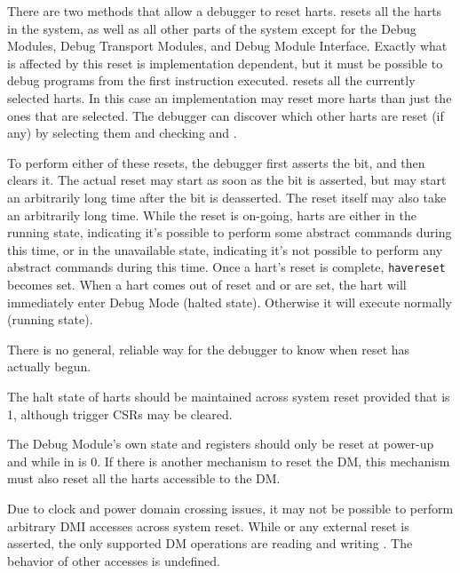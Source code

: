 There are two methods that allow a debugger to reset harts.
\FdmDmcontrolNdmreset resets all the harts in the system, as well as all other
parts of the system except for the Debug Modules, Debug Transport Modules,
and Debug Module Interface.
Exactly what is affected by this reset is implementation dependent, but it
must be possible to debug programs from the first instruction executed.
\FdmDmcontrolHartreset resets all the currently selected harts. In this case an
implementation may reset more harts than just the ones that are selected. The
debugger can discover which other harts are reset (if any) by selecting them
and checking \FdmDmstatusAnyhavereset and \FdmDmstatusAllhavereset.

To perform either of these resets, the debugger first asserts the bit, and then
clears it. The actual reset may start as soon as the bit is asserted, but may
start an arbitrarily long time after the bit is deasserted. The reset itself
may also take an arbitrarily long time.  While the reset is
on-going, harts are either in the running state, indicating it's possible to
perform some abstract commands during this time, or in the unavailable state,
indicating it's not possible to perform any abstract commands during this time.
Once a hart's reset is complete, {\tt havereset} becomes set.  When a hart comes out
of reset and \FdmDmcontrolHaltreq or \Fresethaltreq are set, the hart will
immediately enter Debug Mode (halted state). Otherwise it will execute normally
(running state).

\begin{commentary}
    There is no general, reliable way for the debugger to know when reset has
    actually begun.
\end{commentary}

The halt state of harts should be
maintained across system reset provided that \FdmDmcontrolDmactive is 1,
although trigger CSRs may be cleared.

The Debug Module's own state and registers should only be
reset at power-up and while
\FdmDmcontrolDmactive in \RdmDmcontrol is 0. If there is another mechanism to
reset the DM, this mechanism must also reset all the harts accessible to the
DM.

Due to clock and power domain crossing issues,
it may not be possible to perform arbitrary DMI accesses across
system reset.
While \FdmDmcontrolNdmreset or any external reset is asserted, the only supported DM
operations are reading and writing \RdmDmcontrol. The behavior of other accesses
is undefined.


